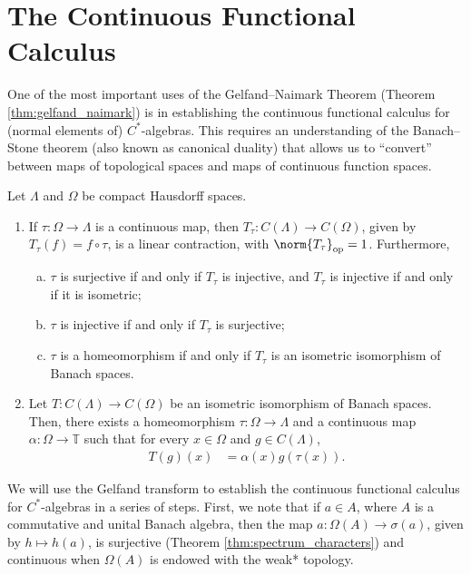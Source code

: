 \section{The Continuous Functional Calculus}%
One of the most important uses of the Gelfand--Naimark Theorem (Theorem \ref{thm:gelfand_naimark}) is in establishing the continuous functional calculus for (normal elements of) $C^{\ast}$-algebras. This requires an understanding of the Banach--Stone theorem (also known as canonical duality) that allows us to ``convert'' between maps of topological spaces and maps of continuous function spaces.
\begin{theorem}\label{thm:banach_stone}
  Let $\Lambda$ and $\Omega$ be compact Hausdorff spaces.
  \begin{enumerate}[(1)]
    \item If $\tau\colon \Omega\rightarrow \Lambda$ is a continuous map, then $T_{\tau}\colon C\left( \Lambda \right)\rightarrow C\left( \Omega \right)$, given by $T_{\tau}\left( f \right) = f\circ \tau$, is a linear contraction, with $\norm{T_{\tau}}_{\op} = 1$. Furthermore,
      \begin{enumerate}[(a)]
        \item $\tau$ is surjective if and only if $T_{\tau}$ is injective, and $T_{\tau}$ is injective if and only if it is isometric;
        \item $\tau$ is injective if and only if $T_{\tau}$ is surjective;
        \item $\tau$ is a homeomorphism if and only if $T_{\tau}$ is an isometric isomorphism of Banach spaces.
      \end{enumerate}
    \item Let $T\colon C\left( \Lambda \right)\rightarrow C\left( \Omega \right)$ be an isometric isomorphism of Banach spaces. Then, there exists a homeomorphism $\tau\colon \Omega\rightarrow \Lambda$ and a continuous map $\alpha\colon \Omega\rightarrow \mathbb{T}$ such that for every $x\in\Omega$ and $g\in C\left( \Lambda \right)$,
      \begin{align*}
        T\left( g \right)\left( x \right) &= \alpha(x)g\left( \tau\left( x \right) \right).
      \end{align*}
  \end{enumerate}
\end{theorem}
We will use the Gelfand transform to establish the continuous functional calculus for $C^{\ast}$-algebras in a series of steps. First, we note that if $a\in A$, where $A$ is a commutative and unital Banach algebra, then the map $\hat{a}\colon \Omega(A)\rightarrow \sigma\left( a \right)$, given by $h\mapsto h(a)$, is surjective (Theorem \ref{thm:spectrum_characters}) and continuous when $\Omega(A)$ is endowed with the weak* topology.\newline

